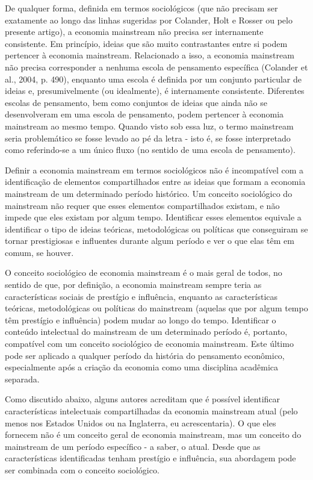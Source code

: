 \documentclass[a4paper,12pt]{article}[abntex2]
\begin{document}
De qualquer forma, definida em termos sociológicos (que não precisam ser exatamente ao longo das linhas sugeridas por Colander, Holt e Rosser ou pelo presente artigo), a economia mainstream não precisa ser internamente consistente. Em princípio, ideias que são muito contrastantes entre si podem pertencer à economia mainstream. Relacionado a isso, a economia mainstream não precisa corresponder a nenhuma escola de pensamento específica (Colander et al., 2004, p. 490), enquanto uma escola é definida por um conjunto particular de ideias e, presumivelmente (ou idealmente), é internamente consistente. Diferentes escolas de pensamento, bem como conjuntos de ideias que ainda não se desenvolveram em uma escola de pensamento, podem pertencer à economia mainstream ao mesmo tempo. Quando visto sob essa luz, o termo mainstream seria problemático se fosse levado ao pé da letra - isto é, se fosse interpretado como referindo-se a um único fluxo (no sentido de uma escola de pensamento).

Definir a economia mainstream em termos sociológicos não é incompatível com a identificação de elementos compartilhados entre as ideias que formam a economia mainstream de um determinado período histórico. Um conceito sociológico do mainstream não requer que esses elementos compartilhados existam, e não impede que eles existam por algum tempo. Identificar esses elementos equivale a identificar o tipo de ideias teóricas, metodológicas ou políticas que conseguiram se tornar prestigiosas e influentes durante algum período e ver o que elas têm em comum, se houver.

O conceito sociológico de economia mainstream é o mais geral de todos, no sentido de que, por definição, a economia mainstream sempre teria as características sociais de prestígio e influência, enquanto as características teóricas, metodológicas ou políticas do mainstream (aquelas que por algum tempo têm prestígio e influência) podem mudar ao longo do tempo. Identificar o conteúdo intelectual do mainstream de um determinado período é, portanto, compatível com um conceito sociológico de economia mainstream. Este último pode ser aplicado a qualquer período da história do pensamento econômico, especialmente após a criação da economia como uma disciplina acadêmica separada.

Como discutido abaixo, alguns autores acreditam que é possível identificar características intelectuais compartilhadas da economia mainstream atual (pelo menos nos Estados Unidos ou na Inglaterra, eu acrescentaria). O que eles fornecem não é um conceito geral de economia mainstream, mas um conceito do mainstream de um período específico - a saber, o atual. Desde que as características identificadas tenham prestígio e influência, sua abordagem pode ser combinada com o conceito sociológico.
\end{document}

